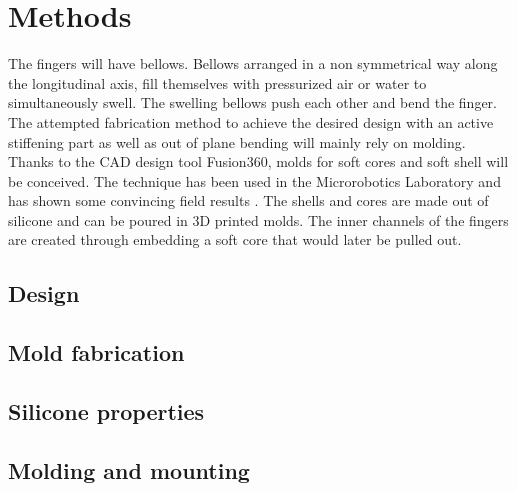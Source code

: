 \section{Methods}
\label{s:Methods}

The fingers will have bellows. Bellows arranged in a non symmetrical way along the longitudinal axis, fill themselves with pressurized air or water to simultaneously swell. The swelling bellows push each other and bend the finger.
The attempted fabrication method to achieve the desired design with an active stiffening part as well as out of plane bending will mainly rely on molding. Thanks to the CAD design tool Fusion360, molds for soft cores and soft shell will be conceived. The technique has been used in the Microrobotics Laboratory and has shown some convincing field results \cite{galloway2016soft}. The shells and cores are made out of silicone and can be poured in 3D printed molds. The inner channels of the fingers are created through embedding a soft core that would later be pulled out.

\subsection{Design}
\label{s:Design}

\subsection{Mold fabrication}
\label{s:Mold fabrication}

\subsection{Silicone properties}
\label{s: Silicone properties}

\subsection{Molding and mounting}
\label{s: Molding and mounting}





